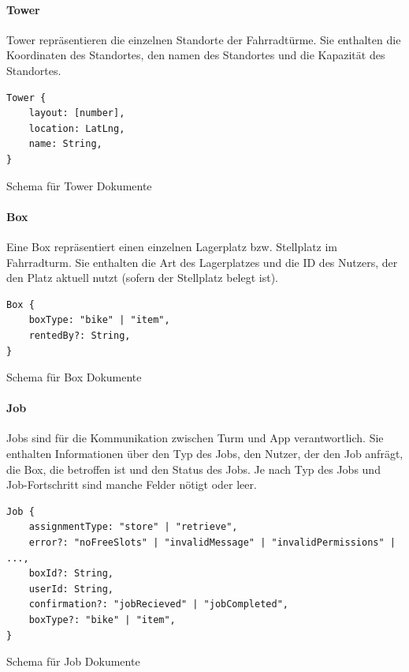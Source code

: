 \paragraph{Tower}
Tower repräsentieren die einzelnen Standorte der Fahrradtürme. Sie enthalten die Koordinaten des Standortes, den namen des Standortes und die Kapazität des Standortes.

\begin{listing}[H]
    \begin{verbatim}
Tower {
    layout: [number],
    location: LatLng,
    name: String,
}
    \end{verbatim}
    \caption{Schema für Tower Dokumente}
    \label{lst:datenbankschema_tower}
\end{listing}

\paragraph{Box}
Eine Box repräsentiert einen einzelnen Lagerplatz bzw. Stellplatz im Fahrradturm. Sie enthalten die Art des Lagerplatzes und die ID des Nutzers, der den Platz aktuell nutzt (sofern der Stellplatz belegt ist).

\begin{listing}[H]
    \begin{verbatim}
Box {
    boxType: "bike" | "item",
    rentedBy?: String,
}
    \end{verbatim}
    \caption{Schema für Box Dokumente}
    \label{lst:datenbankschema_box}
\end{listing}


\paragraph{Job}
Jobs sind für die Kommunikation zwischen Turm und App verantwortlich. Sie enthalten Informationen über den Typ des Jobs, den Nutzer, der den Job anfrägt, die Box, die betroffen ist und den Status des Jobs. Je nach Typ des Jobs und Job-Fortschritt sind manche Felder nötigt oder leer.

\begin{listing}[H]
    \begin{verbatim}
Job {
    assignmentType: "store" | "retrieve",
    error?: "noFreeSlots" | "invalidMessage" | "invalidPermissions" | ...,
    boxId?: String,
    userId: String,
    confirmation?: "jobRecieved" | "jobCompleted",
    boxType?: "bike" | "item",
}
\end{verbatim}
    \caption{Schema für Job Dokumente}
    \label{lst:datenbankstruktur_job}
\end{listing}

